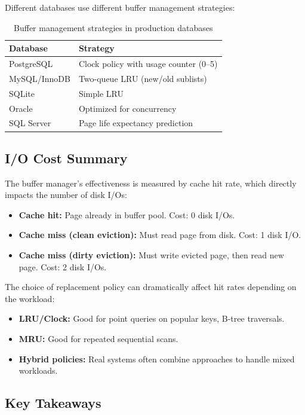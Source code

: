 Different databases use different buffer management strategies:

\begin{table}[ht]
\centering
\begin{tabular}{|l|l|}
\hline
\textbf{Database} & \textbf{Strategy} \\
\hline
PostgreSQL & Clock policy with usage counter (0--5) \\
MySQL/InnoDB & Two-queue LRU (new/old sublists) \\
SQLite & Simple LRU \\
Oracle & Optimized for concurrency \\
SQL Server & Page life expectancy prediction \\
\hline
\end{tabular}
\caption{Buffer management strategies in production databases}
\end{table}

\subsection{I/O Cost Summary}

The buffer manager's effectiveness is measured by cache hit rate, which directly impacts the number of disk I/Os:

\begin{itemize}
    \item \textbf{Cache hit:} Page already in buffer pool. Cost: 0 disk I/Os.
    \item \textbf{Cache miss (clean eviction):} Must read page from disk. Cost: 1 disk I/O.
    \item \textbf{Cache miss (dirty eviction):} Must write evicted page, then read new page. Cost: 2 disk I/Os.
\end{itemize}

The choice of replacement policy can dramatically affect hit rates depending on the workload:
\begin{itemize}
    \item \textbf{LRU/Clock:} Good for point queries on popular keys, B-tree traversals.
    \item \textbf{MRU:} Good for repeated sequential scans.
    \item \textbf{Hybrid policies:} Real systems often combine approaches to handle mixed workloads.
\end{itemize}

\subsection{Key Takeaways}

